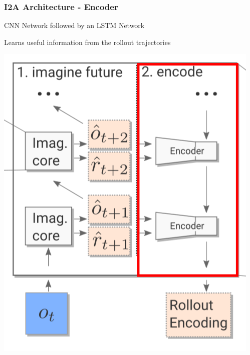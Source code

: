 \begin{frame}
    \frametitle{I2A Architecture - Encoder}

\begin{multicols}{2}
	\begin{PraesentationAufzaehlung}
		\item CNN Network followed by an LSTM Network
		\item Learns useful information from the rollout trajectories
	\end{PraesentationAufzaehlung}
    \vfill\columnbreak
	\begin{center}
    \includegraphics[height=.5\textheight]{./Images/encoder.png}%
	\end{center}
\end{multicols}
    
\end{frame}
\clearpage

